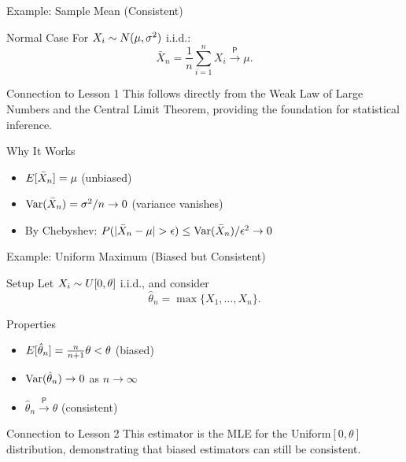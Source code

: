 \begin{frame}{Example: Sample Mean (Consistent)}
  \begin{block}{Normal Case}
    For $X_i \sim N(\mu, \sigma^2)$ i.i.d.:
    \[\bar{X}_n = \frac{1}{n} \sum_{i=1}^n X_i \xrightarrow{\;\mathsf{P}\;} \mu.\]
  \end{block}

  \begin{block}{Connection to Lesson 1}
    This follows directly from the Weak Law of Large Numbers and the
    Central Limit Theorem, providing the foundation for statistical inference.
  \end{block}

  \begin{block}{Why It Works}
    \begin{itemize}
      \item $E[\bar{X}_n] = \mu$ (unbiased)
      \item $\operatorname{Var}(\bar{X}_n) = \sigma^2/n \to 0$ (variance vanishes)
      \item By Chebyshev: $P(|\bar{X}_n - \mu| > \epsilon) \leq \operatorname{Var}(\bar{X}_n)/\epsilon^2 \to 0$
    \end{itemize}
  \end{block}
\end{frame}

\begin{frame}{Example: Uniform Maximum (Biased but Consistent)}
  \begin{block}{Setup}
    Let $X_i \sim U[0, \theta]$ i.i.d., and consider
    \[\hat{\theta}_n = \max\{X_1, \dots, X_n\}.\]
  \end{block}

  \begin{block}{Properties}
    \begin{itemize}
      \item $E[\hat{\theta}_n] = \frac{n}{n+1} \theta < \theta$ (biased)
      \item $\operatorname{Var}(\hat{\theta}_n) \to 0$ as $n \to \infty$
      \item $\hat{\theta}_n \xrightarrow{\;\mathsf{P}\;} \theta$ (consistent)
    \end{itemize}
  \end{block}

  \begin{block}{Connection to Lesson 2}
    This estimator is the MLE for the Uniform$[0,\theta]$ distribution,
    demonstrating that biased estimators can still be consistent.
  \end{block}
\end{frame}

